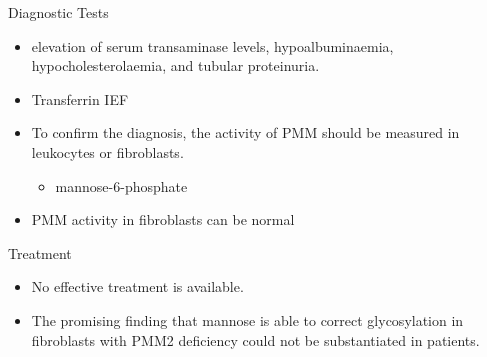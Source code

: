 \documentclass[presentation, smaller]{beamer}
\begin{document}
\begin{frame}[label={sec:orgc730f40}]{Diagnostic Tests}
\begin{itemize}
\item elevation of serum transaminase levels, hypoalbuminaemia, hypocholesterolaemia, and tubular proteinuria.
\item Transferrin IEF
\item To confirm the diagnosis, the activity of PMM should be measured in
leukocytes or fibroblasts.
\begin{itemize}
\item\relax [2-H\(^{\text{3}}\)]mannose-6-phosphate
\end{itemize}
\item PMM activity in fibroblasts can be normal
\end{itemize}
\end{frame}

\begin{frame}[label={sec:orgf594275}]{Treatment}
\begin{itemize}
\item No effective treatment is available.
\item The promising finding that mannose is able to correct glycosylation
in fibroblasts with PMM2 deficiency could not be substantiated in patients.
\end{itemize}
\end{frame}
\end{document}

